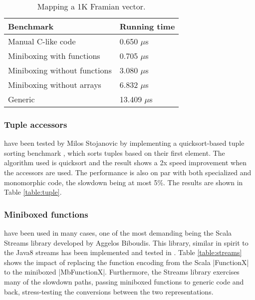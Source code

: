 \begin{table}[b]
  \begin{tabularx}{0.48\textwidth}{|g *{1}{|Y}|} \hline
    \textbf{Benchmark}             &  \textbf{Running time} \\ \hline
    Manual C-like code             &         0.650 $\mu$s \\
    Miniboxing with functions      &         0.705 $\mu$s \\
    Miniboxing without functions   &         3.080 $\mu$s \\
    Miniboxing without arrays      &         6.832 $\mu$s \\
    Generic                        &        13.409 $\mu$s \\ \hline
  \end{tabularx}
  \vspace{-2mm}
  \caption{Mapping a 1K Framian vector.}
  \label{table:framian}
  \vspace{-1em}
\end{table}

\subsubsection{Tuple accessors} have been tested by Milos Stojanovic by implementing a quicksort-based tuple sorting benchmark \cite{tuple-bench}, which sorts tuples based on their first element. The algorithm used is quicksort and the result shows a 2x speed improvement when the accessors are used. The performance is also on par with both specialized and monomorphic code, the slowdown being at most 5\%. The results are shown in Table \ref{table:tuple}.

\subsubsection{Miniboxed functions} have been used in many cases, one of the most demanding being the Scala Streams library developed by Aggelos Biboudis. This library, similar in spirit to the Java8 streams has been implemented and tested in \cite{biboudis_clash_2014}. Table \ref{table:streams} shows the impact of replacing the function encoding from the Scala |FunctionX| to the miniboxed |MbFunctionX|. Furthermore, the Streams library exercises many of the slowdown paths, passing miniboxed functions to generic code and back, stress-testing the conversions between the two representations.

